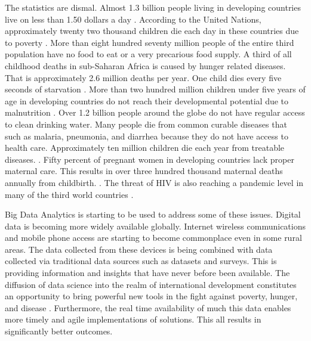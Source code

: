 \documentclass[sigconf]{acmart}
\begin{document}
The statistics are dismal. Almost 1.3 billion people living in developing countries live on less than 1.50 dollars a day \cite{www-google-top5}.  According to the United Nations, approximately twenty two thousand children die each day in these countries due to poverty \cite{www-google-top10}.   More than eight hundred seventy million people of the entire third population have no food to eat or a very precarious food supply. A third of all childhood deaths in sub-Saharan Africa is caused by hunger related diseases. That is approximately 2.6 million deaths per year. One child dies every five seconds of starvation \cite{www-google-top10}. More than two hundred million children under five years of age in developing countries do not reach their developmental potential due to malnutrition \cite{www-google-WikiDevC}.  Over 1.2 billion people around the globe do not have regular access to clean drinking water. Many people die from common curable diseases that such as malaria, pneumonia, and diarrhea because they do not have access to health care. Approximately ten million children die each year from treatable diseases. \cite{www-google-top5}.  Fifty percent of pregnant women in developing countries lack proper maternal care. This results in over three hundred thousand maternal deaths annually from childbirth.  \cite{www-google-top10}. The threat of HIV is also reaching a pandemic level in many of the third world countries \cite{www-google-top5}.

Big Data Analytics is starting to be used to address some of these issues. Digital data is becoming more widely available globally. Internet wireless communications and mobile phone access are starting to become commonplace even in some rural areas. The data collected from these devices is being combined with data collected via traditional data sources such as datasets and surveys. This is providing information and insights that have never before been available. The diffusion of data science into the realm of international development constitutes an opportunity to bring powerful new tools in the fight against poverty, hunger, and disease \cite{www-google-GloPls}. Furthermore, the real time availability of much this data enables more timely and agile implementations of solutions. This all results in significantly better outcomes.
\end{document}
